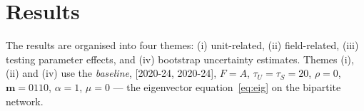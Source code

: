 \section{Results}
\label{sec:results}

The results are organised into four themes: (i) unit-related, (ii) field-related, (iii) testing parameter effects, and (iv) bootstrap uncertainty estimates. Themes (i), (ii) and (iv) use the \textit{baseline}, [2020-24, 2020-24], $F=A$, $\tau_U=\tau_S=20$, $\rho=0$, $\mathbf{m}=0110$, $\alpha=1$, $\mu=0$ --- the eigenvector equation~\eqref{eq:eig} on the bipartite network.




